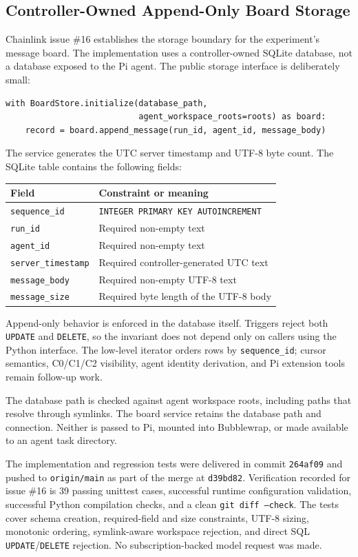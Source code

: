 \subsection{Controller-Owned Append-Only Board Storage}

Chainlink issue \#16 establishes the storage boundary for the experiment's
message board.  The implementation uses a controller-owned SQLite database,
not a database exposed to the Pi agent.  The public storage interface is
deliberately small:

\begin{verbatim}
with BoardStore.initialize(database_path,
                           agent_workspace_roots=roots) as board:
    record = board.append_message(run_id, agent_id, message_body)
\end{verbatim}

The service generates the UTC server timestamp and UTF-8 byte count.  The
SQLite table contains the following fields:

\begin{center}
\begin{tabular}{ll}
\textbf{Field} & \textbf{Constraint or meaning} \\
\hline
\texttt{sequence\_id} & \texttt{INTEGER PRIMARY KEY AUTOINCREMENT} \\
\texttt{run\_id} & Required non-empty text \\
\texttt{agent\_id} & Required non-empty text \\
\texttt{server\_timestamp} & Required controller-generated UTC text \\
\texttt{message\_body} & Required non-empty UTF-8 text \\
\texttt{message\_size} & Required byte length of the UTF-8 body \\
\end{tabular}
\end{center}

Append-only behavior is enforced in the database itself.  Triggers reject
both \texttt{UPDATE} and \texttt{DELETE}, so the invariant does not depend
only on callers using the Python interface.  The low-level iterator orders
rows by \texttt{sequence\_id}; cursor semantics, C0/C1/C2 visibility, agent
identity derivation, and Pi extension tools remain follow-up work.

The database path is checked against agent workspace roots, including paths
that resolve through symlinks.  The board service retains the database path
and connection.  Neither is passed to Pi, mounted into Bubblewrap, or made
available to an agent task directory.

The implementation and regression tests were delivered in commit
\texttt{264af09} and pushed to \texttt{origin/main} as part of the merge at
\texttt{d39bd82}.  Verification recorded for issue \#16 is 39 passing
unittest cases, successful runtime configuration validation, successful
Python compilation checks, and a clean \texttt{git diff --check}.  The tests
cover schema creation, required-field and size constraints, UTF-8 sizing,
monotonic ordering, symlink-aware workspace rejection, and direct SQL
\texttt{UPDATE}/\texttt{DELETE} rejection.  No subscription-backed model
request was made.
